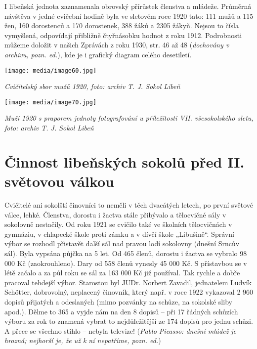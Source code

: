 I libeňská jednota zaznamenala obrovský přírůstek členstva a mládeže.
Průměrná návštěva v jedné cvičební hodině byla ve sletovém roce 1920
tato: 111 mužů a 115 žen, 160 dorostenců a 170 dorostenek, 388 žáků a
2305 žákyň. Nejsou to čísla vymyšlená, odpovídají přibližně čtyřnásobku
hodnot z roku 1912. Podrobnosti můžeme doložit v našich Zprávách z roku
1930, str. 46 až 48 (\emph{dochovány v archivu, pozn. ed.}), kde je i
grafický diagram celého desetiletí.

\texttt{[image: media/image60.jpg]}

\emph{Cvičitelský sbor mužů 1920, foto: archiv T. J. Sokol Libeň}

\texttt{[image: media/image70.jpg]}

\emph{Muži 1920 s praporem jednoty fotografování u příležitosti VII.
všesokolského sletu, foto: archiv T. J. Sokol Libeň}

\section{Činnost libeňských sokolů před II. světovou
válkou}\label{ux10dinnost-libeux148skuxfdch-sokolux16f-pux159ed-ii.-svux11btovou-vuxe1lkou}

Cvičitelé ani sokolští činovníci to neměli v těch dvacátých letech, po
první světové válce, lehké. Členstva, dorostu i žactva stále přibývalo a
tělocvičné sály v sokolovně nestačily. Od roku 1921 se cvičilo také ve
školních tělocvičnách v gymnáziu, v chlapecké škole proti zámku a v
dívčí škole „Libušině``. Správní výbor se rozhodl přistavět další sál
nad pravou lodí sokolovny (dnešní Srncův sál). Byla vypsána půjčka na 5
let. Od 465 členů, dorostu i žactva se vybralo 98 000 Kč (zaokrouhleno).
Dary od 558 členů vynesly 45 000 Kč. S přístavbou se v létě začalo a za
půl roku se sál za 163 000 Kč již používal. Tak rychle a dobře pracoval
tehdejší výbor. Starostou byl JUDr. Norbert Zavadil, jednatelem Ludvík
Schötter, dobrovolný, neplacený činovník, který např. v roce 1922
vykazoval 2 960 dopisů přijatých a odeslaných (mimo pozvánky na schůze,
na sokolské sliby apod.). Dělme to 365 a vyjde nám na den 8 dopisů --
při 17 řádných schůzích výboru za rok to znamená vybrat to
nejdůležitější ze 174 dopisů pro jednu schůzi. A přece se všechno stihlo
-- nebyla televize! (\emph{Pablo Picasso: dnešní mládež je hrozná;
nejhorší je, že už k ní nepatříme, pozn. ed.})

